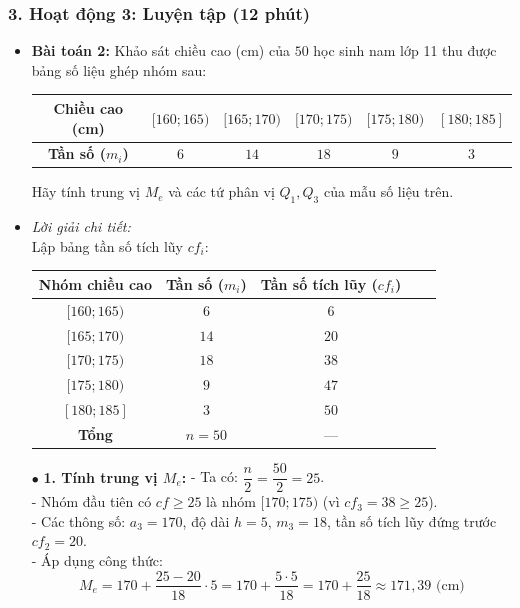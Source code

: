 \documentclass[12pt, a4paper]{article}
\begin{document}
\subsubsection*{3. Hoạt động 3: Luyện tập (12 phút)}
\begin{itemize}
    \item \textbf{Bài toán 2:} Khảo sát chiều cao (cm) của $50$ học sinh nam lớp 11 thu được bảng số liệu ghép nhóm sau:
    \begin{center}
    \begin{tabular}{|c|c|c|c|c|c|}
    \hline
    \textbf{Chiều cao (cm)} & $[160; 165)$ & $[165; 170)$ & $[170; 175)$ & $[175; 180)$ & $[180; 185]$ \\
    \hline
    \textbf{Tần số ($m_i$)} & $6$ & $14$ & $18$ & $9$ & $3$ \\
    \hline
    \end{tabular}
    \end{center}
    Hãy tính trung vị $M_e$ và các tứ phân vị $Q_1, Q_3$ của mẫu số liệu trên.
    \item \textit{Lời giải chi tiết:}\\
    Lập bảng tần số tích lũy $cf_i$:
    \begin{center}
    \begin{tabular}{|c|c|c|c|c|}
    \hline
    \textbf{Nhóm chiều cao} & \textbf{Tần số ($m_i$)} & \textbf{Tần số tích lũy ($cf_i$)} \\
    \hline
    $[160; 165)$ & $6$ & $6$ \\
    $[165; 170)$ & $14$ & $20$ \\
    $[170; 175)$ & $18$ & $38$ \\
    $[175; 180)$ & $9$ & $47$ \\
    $[180; 185]$ & $3$ & $50$ \\
    \hline
    \textbf{Tổng} & $n = 50$ & --- \\
    \hline
    \end{tabular}
    \end{center}

    $\bullet$ \textbf{1. Tính trung vị $M_e$:}
    - Ta có: $\dfrac{n}{2} = \dfrac{50}{2} = 25$.\\
    - Nhóm đầu tiên có $cf \ge 25$ là nhóm $[170; 175)$ (vì $cf_3 = 38 \ge 25$).\\
    - Các thông số: $a_3 = 170$, độ dài $h = 5$, $m_3 = 18$, tần số tích lũy đứng trước $cf_2 = 20$.\\
    - Áp dụng công thức:
    $$M_e = 170 + \dfrac{25 - 20}{18} \cdot 5 = 170 + \dfrac{5 \cdot 5}{18} = 170 + \dfrac{25}{18} \approx 171{,}39\text{ (cm)}$$


\end{itemize}
\end{document}
